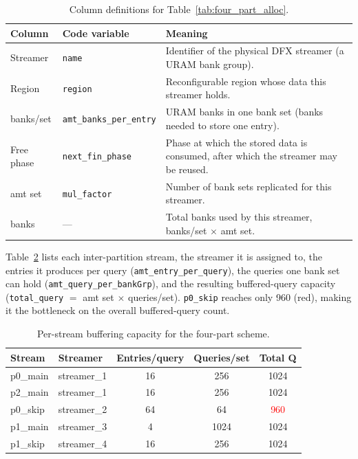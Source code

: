 \documentclass{cernatsnote}
\begin{document}
\begin{table}[H]
  \centering
  \footnotesize
  \caption{Column definitions for Table~\ref{tab:four_part_alloc}.}
  \label{tab:alloc_cols}
  \begin{tabular}{l l p{7.5cm}}
    \toprule
    Column & Code variable & Meaning \\
    \midrule
    Streamer   & \texttt{name}                  & Identifier of the physical DFX streamer (a URAM bank group). \\
    Region     & \texttt{region}                & Reconfigurable region whose data this streamer holds. \\
    banks/set  & \texttt{amt\_banks\_per\_entry} & URAM banks in one bank set (banks needed to store one entry). \\
    Free phase & \texttt{next\_fin\_phase}      & Phase at which the stored data is consumed, after which the streamer may be reused. \\
    amt set    & \texttt{mul\_factor}           & Number of bank sets replicated for this streamer. \\
    banks      & ---                            & Total banks used by this streamer, banks/set $\times$ amt set. \\
    \bottomrule 
  \end{tabular}
\end{table}

Table~\ref{tab:four_part_streams} lists each inter-partition stream, the streamer it is assigned to, the entries it produces per query (\texttt{amt\_entry\_per\_query}), the queries one bank set can hold (\texttt{amt\_query\_per\_bankGrp}), and the resulting buffered-query capacity (\texttt{total\_query} $=$ amt set $\times$ queries/set). \texttt{p0\_skip} reaches only 960 (red), making it the bottleneck on the overall buffered-query count.

\begin{table}[H]
  \centering
  \footnotesize
  \caption{Per-stream buffering capacity for the four-part scheme.}
  \label{tab:four_part_streams}
  \begin{tabular}{l l c c c}
    \toprule
    Stream & Streamer & Entries/query & Queries/set & Total Q \\
    \midrule
    p0\_main & streamer\_1 & 16 &  256 & 1024 \\
    p2\_main & streamer\_1 & 16 &  256 & 1024 \\
    p0\_skip & streamer\_2 & 64 &   64 & \textcolor{red}{960} \\
    p1\_main & streamer\_3 &  4 & 1024 & 1024 \\
    p1\_skip & streamer\_4 & 16 &  256 & 1024 \\
    \bottomrule
  \end{tabular} 
\end{table}
\end{document}
